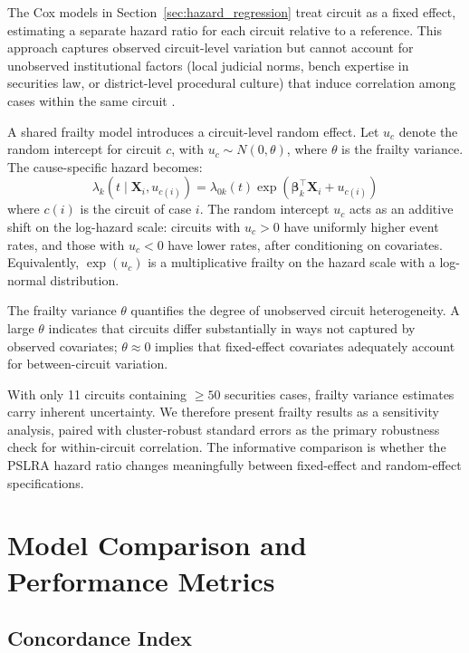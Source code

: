 The Cox models in Section~\ref{sec:hazard_regression} treat circuit as a fixed effect,
estimating a separate hazard ratio for each circuit relative
to a reference. This approach captures observed
circuit-level variation but cannot account for unobserved
institutional factors (local judicial norms, bench expertise
in securities law, or district-level procedural culture) that
induce correlation among cases within the same circuit
\citep{ruetenbudde2019}.

A shared frailty model introduces a circuit-level random
effect. Let $u_c$ denote the random intercept for circuit $c$,
with $u_c \sim N(0, \theta)$, where $\theta$ is the frailty
variance. The cause-specific hazard becomes:
\begin{equation}
\lambda_k(t \mid \mathbf{X}_i, u_{c(i)}) = \lambda_{0k}(t) \exp(\boldsymbol{\beta}_k^\top \mathbf{X}_i + u_{c(i)})
\end{equation}
where $c(i)$ is the circuit of case $i$. The random intercept
$u_c$ acts as an additive shift on the log-hazard scale:
circuits with $u_c > 0$ have uniformly higher event rates, and
those with $u_c < 0$ have lower rates, after conditioning on
covariates. Equivalently, $\exp(u_c)$ is a multiplicative
frailty on the hazard scale with a log-normal distribution.

The frailty variance $\theta$ quantifies the degree of
unobserved circuit heterogeneity. A large $\theta$ indicates
that circuits differ substantially in ways not captured by
observed covariates; $\theta \approx 0$ implies that
fixed-effect covariates adequately account for between-circuit
variation.

With only 11 circuits containing $\geq 50$ securities cases,
frailty variance estimates carry inherent uncertainty.
We therefore present frailty results as a sensitivity analysis,
paired with cluster-robust standard errors as the primary
robustness check for within-circuit correlation. The informative
comparison is whether the PSLRA hazard ratio changes
meaningfully between fixed-effect and random-effect
specifications.

\section{Model Comparison and Performance Metrics}

\subsection{Concordance Index}


